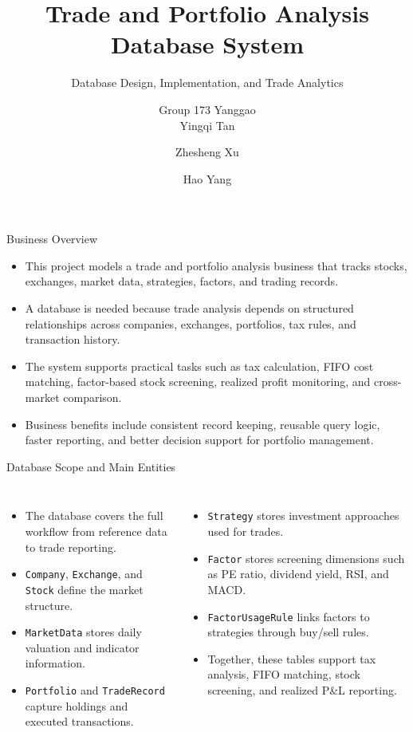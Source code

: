 \documentclass[aspectratio=169]{beamer}
\title[Trade and Portfolio Analysis]{Trade and Portfolio Analysis Database System}
\subtitle{Database Design, Implementation, and Trade Analytics}
\author[Group 173 Yanggao]{Group 173 Yanggao\\Yingqi Tan \and Zhesheng Xu \and Hao Yang}
\institute[MISY330 Spring 2026]{MISY330 Database Design and Implementation\\Spring 2026}
\date{}
\begin{document}
\begin{frame}
    \titlepage
\end{frame}

\begin{frame}{Business Overview}
\begin{itemize}
    \item This project models a trade and portfolio analysis business that tracks stocks, exchanges, market data, strategies, factors, and trading records.
    \item A database is needed because trade analysis depends on structured relationships across companies, exchanges, portfolios, tax rules, and transaction history.
    \item The system supports practical tasks such as tax calculation, FIFO cost matching, factor-based stock screening, realized profit monitoring, and cross-market comparison.
    \item Business benefits include consistent record keeping, reusable query logic, faster reporting, and better decision support for portfolio management.
\end{itemize}
\end{frame}

\begin{frame}{Database Scope and Main Entities}
\small
\begin{columns}[T,onlytextwidth]
    \begin{itemize}
        \item The database covers the full workflow from reference data to trade reporting.
        \item \texttt{Company}, \texttt{Exchange}, and \texttt{Stock} define the market structure.
        \item \texttt{MarketData} stores daily valuation and indicator information.
        \item \texttt{Portfolio} and \texttt{TradeRecord} capture holdings and executed transactions.
    \end{itemize}
    \begin{itemize}
        \item \texttt{Strategy} stores investment approaches used for trades.
        \item \texttt{Factor} stores screening dimensions such as PE ratio, dividend yield, RSI, and MACD.
        \item \texttt{FactorUsageRule} links factors to strategies through buy/sell rules.
        \item Together, these tables support tax analysis, FIFO matching, stock screening, and realized P\&L reporting.
    \end{itemize}
\end{columns}
\end{frame}
\end{document}
